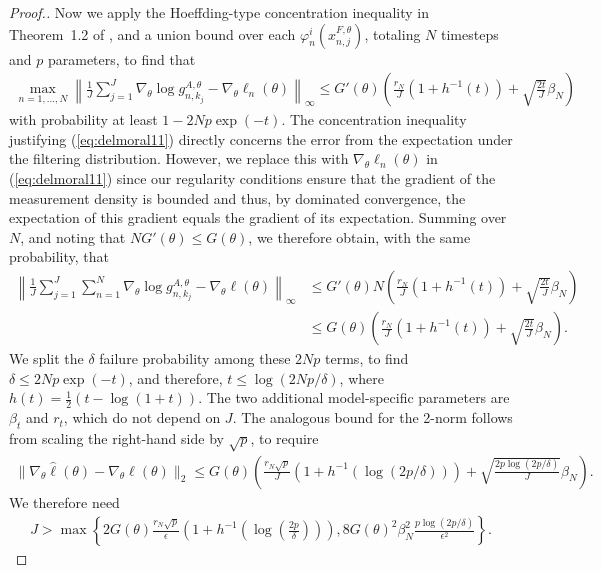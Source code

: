 \begin{proof}[Proof.]
Now we apply the Hoeffding-type concentration inequality in Theorem~1.2 of \cite{delMoral11}, and a union bound over each $\varphi_n^i(x_{n,j}^{F,\theta})$, totaling $N$ timesteps and $p$ parameters, to find that
\begin{align} \label{eq:delmoral11}
    \max_{n=1,...,N} \left\lVert\frac{1}{J}\sum_{j=1}^J\nabla_\theta \log g_{n,k_j}^{A,\theta} - \nabla_\theta \ell_n(\theta) \right\rVert_{\infty} \leq G'(\theta)\left(\frac{r_N}{J}(1+h^{-1}(t)) + \sqrt{\frac{2t}{J}}\beta_N \right)
\end{align}
with probability at least $1-2Np\exp(-t)$.
The concentration inequality justifying (\ref{eq:delmoral11}) directly concerns the error from the expectation under the filtering distribution.
However, we replace this with $\nabla_\theta \ell_n(\theta)$ in  (\ref{eq:delmoral11}) since our regularity conditions ensure that the gradient of the measurement density is bounded and thus, by dominated convergence, the expectation of this gradient equals the gradient of its expectation.
Summing over $N$, and noting that $NG'(\theta) \leq G(\theta)$, we therefore obtain, with the same probability, that
\begin{align}
    \left\lVert\frac{1}{J}\sum_{j=1}^J\sum_{n=1}^N\nabla_\theta \log g_{n,k_j}^{A,\theta} - \nabla_\theta \ell(\theta) \right\rVert_{\infty} 
    &\leq G'(\theta)N\left(\frac{r_N}{J}(1+h^{-1}(t)) + \sqrt{\frac{2t}{J}}\beta_N \right)\\
    &\leq G(\theta)\left(\frac{r_N}{J}(1+h^{-1}(t)) + \sqrt{\frac{2t}{J}}\beta_N \right).
\end{align}
We split the $\delta$ failure probability among these $2Np$ terms, to find $\delta\leq2Np\exp(-t)$, and therefore, $t\leq\log(2Np/\delta)$, where $h(t) = \frac{1}{2}(t - \log(1+t))$. 
The two additional model-specific parameters are $\beta_t$ and $r_t$, which do not depend on $J$. 
The analogous bound for the 2-norm follows from scaling the right-hand side by $\sqrt{p}$, to require 
\begin{align}
    \|\nabla_\theta \hat\ell(\theta) - \nabla_\theta \ell(\theta)\|_2 \leq G(\theta)\left(\frac{r_N\sqrt{p}}{J}(1+h^{-1}(\log(2p/\delta))) + \sqrt{\frac{2p\log(2p/\delta)}{J}}\beta_N\right).
\end{align}
We therefore need 
\begin{align}
    J > \max\left\{2G(\theta)\frac{r_N\sqrt{p}}{\epsilon}\left(1+h^{-1}\left(\log\left(\frac{2p}{\delta}\right)\right)\right), 8G(\theta)^2\beta_N^2\frac{p\log(2p/\delta)}{\epsilon^2}\right\}.
\end{align}

\end{proof}

